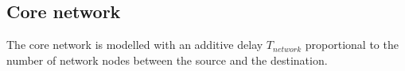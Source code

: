 \subsection{Core network}
The core network is modelled with an additive delay $T_{network}$ proportional to the number of network nodes between the source and the destination.